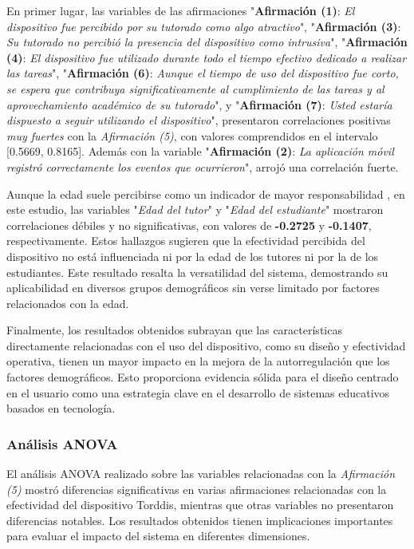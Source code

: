 \documentclass[a4paper,fleqn]{cas-sc}
\begin{document}
				En primer lugar, las variables de las afirmaciones "\textbf{Afirmación (1)}: \textit{El dispositivo fue percibido por su tutorado como algo atractivo}", "\textbf{Afirmación (3)}: \textit{Su tutorado no percibió la presencia del dispositivo como intrusiva}", "\textbf{Afirmación (4)}: \textit{El dispositivo fue utilizado durante todo el tiempo efectivo dedicado a realizar las tareas}", "\textbf{Afirmación (6)}: \textit{Aunque el tiempo de uso del dispositivo fue corto, se espera que contribuya significativamente al cumplimiento de las tareas y al aprovechamiento académico de su tutorado}", y "\textbf{Afirmación (7)}: \textit{Usted estaría dispuesto a seguir utilizando el dispositivo}", presentaron correlaciones positivas \textit{muy fuertes} con la \textit{Afirmación (5)}, con valores comprendidos en el intervalo [0.5669, 0.8165]. Además con la variable "\textbf{Afirmación (2)}: \textit{La aplicación móvil registró correctamente los eventos que ocurrieron}", arrojó una correlación fuerte.
				
				Aunque la edad suele percibirse como un indicador de mayor responsabilidad \citep{Moss2018Why}, en este estudio, las variables "\textit{Edad del tutor}" y "\textit{Edad del estudiante}" mostraron correlaciones débiles y no significativas, con valores de \textbf{-0.2725} y \textbf{-0.1407}, respectivamente. Estos hallazgos sugieren que la efectividad percibida del dispositivo no está influenciada ni por la edad de los tutores ni por la de los estudiantes. Este resultado resalta la versatilidad del sistema, demostrando su aplicabilidad en diversos grupos demográficos sin verse limitado por factores relacionados con la edad.
				
				Finalmente, los resultados obtenidos subrayan que las características directamente relacionadas con el uso del dispositivo, como su diseño y efectividad operativa, tienen un mayor impacto en la mejora de la autorregulación que los factores demográficos. Esto proporciona evidencia sólida para el diseño centrado en el usuario como una estrategia clave en el desarrollo de sistemas educativos basados en tecnología.
			
			\subsubsection{Análisis ANOVA}
				El análisis ANOVA realizado sobre las variables relacionadas con la \textit{Afirmación (5)} mostró diferencias significativas en varias afirmaciones relacionadas con la efectividad del dispositivo Torddis, mientras que otras variables no presentaron diferencias notables. Los resultados obtenidos tienen implicaciones importantes para evaluar el impacto del sistema en diferentes dimensiones.
				
\end{document}
